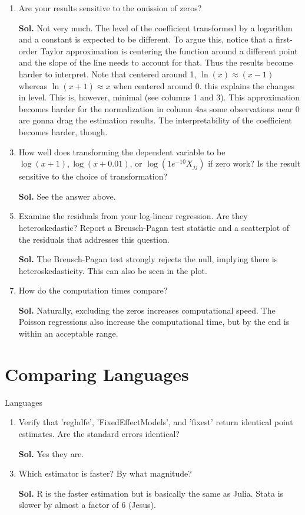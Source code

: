 \documentclass[12pt,oneside,reqno]{amsart}
\begin{document}
\begin{enumerate}[leftmargin=*,label=\textbf{(\roman*)}]
    \item Are your results sensitive to the omission of zeros?
    \item[\textbf{Sol.}] Not very much. The level of the coefficient transformed by a logarithm and a constant is expected to be different. To argue this, notice that a first-order Taylor approximation is centering the function around a different point and the slope of the line needs to account for that. Thus the results become harder to interpret. Note that centered around 1, $\ln(x)\approx (x-1)$ whereas $\ln(x+1)\approx x$ when centered around 0. this explains the changes in level. This is, however, minimal (see columns 1 and 3). This approximation becomes harder for the normalization in column 4as some observations near 0 are gonna drag the estimation results. The interpretability of the coefficient becomes harder, though. 
    \item How well does transforming the dependent variable to be $\log (x+1), \log (x+0.01)$, or $\log \left(1 e^{-10} X_{j j}\right)$ if zero work? Is the result sensitive to the choice of transformation?
    \item[\textbf{Sol.}] See the answer above. 
    \item Examine the residuals from your log-linear regression. Are they heteroskedastic? Report a Breusch-Pagan test statistic and a scatterplot of the residuals that addresses this question.
    \item[\textbf{Sol.}] The Breusch-Pagan test strongly rejects the null, implying there is heteroskedasticity. This can also be seen in the plot. 
    \item How do the computation times compare?
    \item[\textbf{Sol.}] Naturally, excluding the zeros increases computational speed. The Poisson regressions also increase the computational time, but by the end is within an acceptable range. 
\end{enumerate}

\clearpage 
\section{Comparing Languages}
\begin{table}[htb]
    \caption{Languages}
    
\end{table}

\begin{enumerate}[leftmargin=*,label=\textbf{(\roman*)}]
    \item Verify that 'reghdfe', 'FixedEffectModels', and 'fixest' return identical point estimates. Are the standard errors identical?
    \item[\textbf{Sol.}] Yes they are. 
    \item Which estimator is faster? By what magnitude?
    \item[\textbf{Sol.}] R is the faster estimation but is basically the same as Julia. Stata is slower by almost a factor of 6 (Jesus). 
\end{enumerate}
\end{document}
